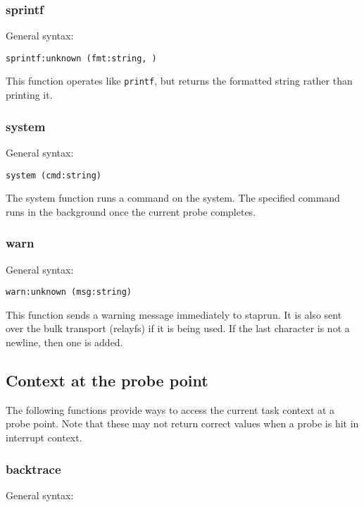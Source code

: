 \documentclass[twoside,english]{article}
\newenvironment{vindent}
{\begin{list}{}{\setlength{\listparindent}{6pt}}
\item[]}
{\end{list}}
\begin{document}
\subsubsection{sprintf}
General syntax:

\begin{vindent}
\begin{verbatim}
sprintf:unknown (fmt:string, )
\end{verbatim}
\end{vindent}
This function operates like \texttt{printf}, but returns the formatted string
rather than printing it.


\subsubsection{system}
General syntax:

\begin{vindent}
\begin{verbatim}
system (cmd:string)
\end{verbatim}
\end{vindent}
The system function runs a command on the system. The specified command runs
in the background once the current probe completes. 


\subsubsection{warn}
General syntax:

\begin{vindent}
\begin{verbatim}
warn:unknown (msg:string)
\end{verbatim}
\end{vindent}
This function sends a warning message immediately to staprun. It is also
sent over the bulk transport (relayfs) if it is being used. If the last character
is not a newline, then one is added.

\subsection{Context at the probe point}

The following functions provide ways to access the current task context 
at a probe point. Note that these may not return correct values when
a probe is hit in interrupt context.

\subsubsection{backtrace}
General syntax:
\end{document}
